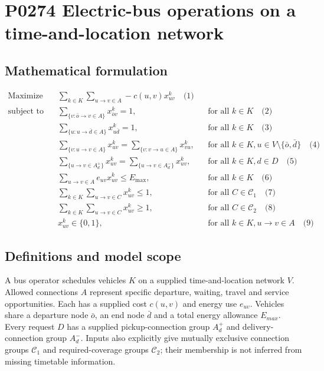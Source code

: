 \documentclass[10pt]{article}
\begin{document}
\section*{P0274 Electric-bus operations on a time-and-location network}
\subsection*{Mathematical formulation}
\begin{align*}
\text{Maximize} \quad & \sum_{k \in K} \sum_{u \to v \in A} -c(u, v) x^k_{uv} \quad \text{(1)} \\
\text{subject to} \quad & \sum_{\{v: \bar{o} \to v \in A\}} x^k_{\bar{o}v} = 1, && \text{for all } k \in K \quad \text{(2)} \\
& \sum_{\{u: u \to \bar{d} \in A\}} x^k_{u\bar{d}} = 1, && \text{for all } k \in K \quad \text{(3)} \\
& \sum_{\{v: u \to v \in A\}} x^k_{uv} = \sum_{\{v: v \to u \in A\}} x^k_{vu}, && \text{for all } k \in K, u \in V \setminus \{\bar{o}, \bar{d}\} \quad \text{(4)} \\
& \sum_{\{u \to v \in A^+_d\}} x^k_{uv} = \sum_{\{u \to v \in A^-_d\}} x^k_{uv}, && \text{for all } k \in K, d \in D \quad \text{(5)} \\
& \sum_{u \to v \in A} e_{uv} x^k_{uv} \le E_{\text{max}}, && \text{for all } k \in K \quad \text{(6)} \\
& \sum_{k \in K} \sum_{u \to v \in C} x^k_{uv} \le 1, && \text{for all } C \in \mathcal{C}_1 \quad \text{(7)} \\
& \sum_{k \in K} \sum_{u \to v \in C} x^k_{uv} \ge 1, && \text{for all } C \in \mathcal{C}_2 \quad \text{(8)} \\
& x^k_{uv} \in \{0, 1\}, && \text{for all } k \in K, u \to v \in A \quad \text{(9)}
\end{align*}

\subsection*{Definitions and model scope}
A bus operator schedules vehicles $K$ on a supplied time-and-location network $V$. Allowed connections $A$ represent specific departure, waiting, travel and service opportunities. Each has a supplied cost $c(u,v)$ and energy use $e_{uv}$. Vehicles share a departure node $\bar o$, an end node $\bar d$ and a total energy allowance $E_{max}$. Every request $D$ has a supplied pickup-connection group $A_d^+$ and delivery-connection group $A_d^-$. Inputs also explicitly give mutually exclusive connection groups $\mathcal C_1$ and required-coverage groups $\mathcal C_2$; their membership is not inferred from missing timetable information.
\end{document}
